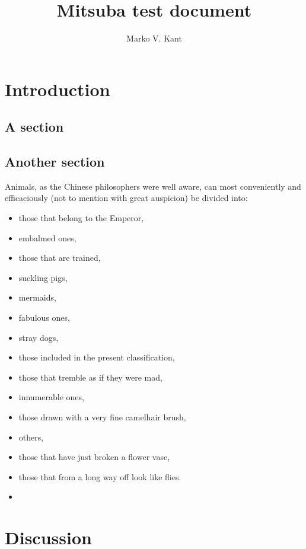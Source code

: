 \documentclass{mitsuba}
\title{Mitsuba test document}
\author{Marko V. Kant}
\begin{document}
\maketitle

\tableofcontents

\chapter{Introduction}

\kant[1]

\section{A section}

\kant[2-5]

\section{Another section}

\kant[6-8]

Animals, as the Chinese philosophers were well aware, can most conveniently
and efficaciously (not to mention with great auspicion) be divided into:
\begin{itemize}
\item those that belong to the Emperor,
\item embalmed ones,
\item those that are trained,
\item suckling pigs,
\item mermaids,
\item fabulous ones,
\item stray dogs,
\item those included in the present classification,
\item those that tremble as if they were mad,
\item innumerable ones,
\item those drawn with a very fine camelhair brush,
\item others,
\item those that have just broken a flower vase,
\item those that from a long way off look like flies.
\item \kant[36-38]
\end{itemize}

\kant[9-10]

\kant[22-35]

\chapter{Discussion}
\end{document}
